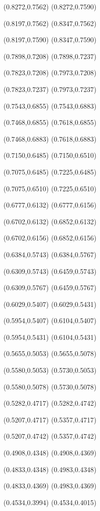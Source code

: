 \PST@Dashed(0.8272,0.7562)
(0.8272,0.7590)

\PST@Dashed(0.8197,0.7562)
(0.8347,0.7562)

\PST@Dashed(0.8197,0.7590)
(0.8347,0.7590)

\PST@Dashed(0.7898,0.7208)
(0.7898,0.7237)

\PST@Dashed(0.7823,0.7208)
(0.7973,0.7208)

\PST@Dashed(0.7823,0.7237)
(0.7973,0.7237)

\PST@Dashed(0.7543,0.6855)
(0.7543,0.6883)

\PST@Dashed(0.7468,0.6855)
(0.7618,0.6855)

\PST@Dashed(0.7468,0.6883)
(0.7618,0.6883)

\PST@Dashed(0.7150,0.6485)
(0.7150,0.6510)

\PST@Dashed(0.7075,0.6485)
(0.7225,0.6485)

\PST@Dashed(0.7075,0.6510)
(0.7225,0.6510)

\PST@Dashed(0.6777,0.6132)
(0.6777,0.6156)

\PST@Dashed(0.6702,0.6132)
(0.6852,0.6132)

\PST@Dashed(0.6702,0.6156)
(0.6852,0.6156)

\PST@Dashed(0.6384,0.5743)
(0.6384,0.5767)

\PST@Dashed(0.6309,0.5743)
(0.6459,0.5743)

\PST@Dashed(0.6309,0.5767)
(0.6459,0.5767)

\PST@Dashed(0.6029,0.5407)
(0.6029,0.5431)

\PST@Dashed(0.5954,0.5407)
(0.6104,0.5407)

\PST@Dashed(0.5954,0.5431)
(0.6104,0.5431)

\PST@Dashed(0.5655,0.5053)
(0.5655,0.5078)

\PST@Dashed(0.5580,0.5053)
(0.5730,0.5053)

\PST@Dashed(0.5580,0.5078)
(0.5730,0.5078)

\PST@Dashed(0.5282,0.4717)
(0.5282,0.4742)

\PST@Dashed(0.5207,0.4717)
(0.5357,0.4717)

\PST@Dashed(0.5207,0.4742)
(0.5357,0.4742)

\PST@Dashed(0.4908,0.4348)
(0.4908,0.4369)

\PST@Dashed(0.4833,0.4348)
(0.4983,0.4348)

\PST@Dashed(0.4833,0.4369)
(0.4983,0.4369)

\PST@Dashed(0.4534,0.3994)
(0.4534,0.4015)

